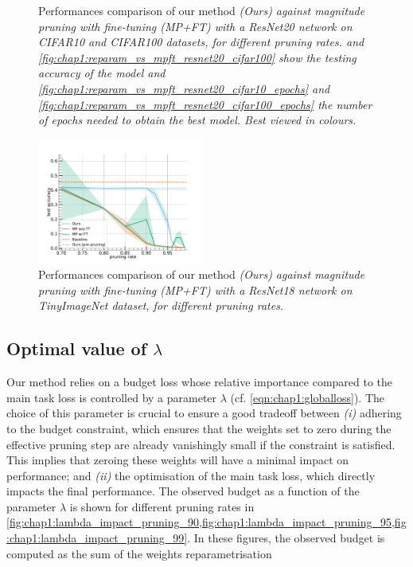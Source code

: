 \begin{figure}
  \caption{ Performances comparison of our method \em{(Ours)} against
  magnitude pruning with fine-tuning \em{(MP+FT)} with a ResNet20 network on
  CIFAR10 and CIFAR100 datasets, for different pruning rates.
   and
  \cref{fig:chap1:reparam_vs_mpft_resnet20_cifar100} show the
  testing accuracy of the model and
  \cref{fig:chap1:reparam_vs_mpft_resnet20_cifar10_epochs} and
  \cref{fig:chap1:reparam_vs_mpft_resnet20_cifar100_epochs}
  the number of epochs needed to obtain the best model. Best viewed in colours.}
  \label{fig:chap1:reparam_vs_mpft_resnet20}
\end{figure}


\begin{figure}
  \centering
  \includegraphics[width=0.49\textwidth]{chapter_1/assets/reparam_vs_mpft_PrunableResNet18_tinyimagenet.pdf}
  \caption{Performances comparison of our method \em{(Ours)} against
  magnitude pruning with fine-tuning \em{(MP+FT)} with a ResNet18 network on
  TinyImageNet dataset, for different pruning rates.}
  \label{fig:chap1:reparam_vs_mpft_resnet18}
\end{figure}



\subsection{Optimal value of \texorpdfstring{$\lambda$}{Lambda}}
\label{sec:chap1:impact_of_lambda}


Our method relies on a budget loss whose relative importance compared to the
main task loss is controlled by a parameter $\lambda$ (cf.
\cref{eqn:chap1:globalloss}). The choice of this parameter is crucial to ensure
a good tradeoff between \emph{(i)} adhering to the budget constraint, which
ensures that the weights set to zero during the effective pruning step are
already vanishingly small if the constraint is satisfied. This implies that
zeroing these weights will have a minimal impact on performance; and \emph{(ii)}
the optimisation of the main task loss, which directly impacts the final
performance. The observed budget as a function of the parameter $\lambda$ is
shown for different pruning rates in
\cref{fig:chap1:lambda_impact_pruning_90,fig:chap1:lambda_impact_pruning_95,fig:chap1:lambda_impact_pruning_99}.
In these figures, the observed budget is computed as the sum of the weights
reparametrisation\\

